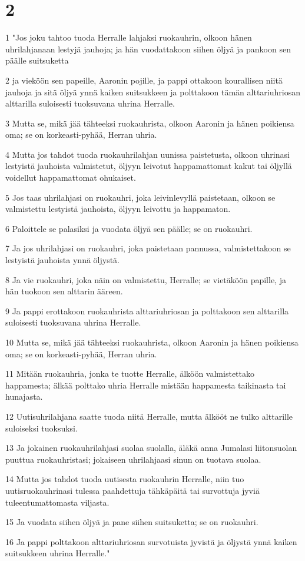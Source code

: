 \chapter{2}

\par 1 "Jos joku tahtoo tuoda Herralle lahjaksi ruokauhrin, olkoon hänen uhrilahjanaan lestyjä jauhoja; ja hän vuodattakoon siihen öljyä ja pankoon sen päälle suitsuketta
\par 2 ja vieköön sen papeille, Aaronin pojille, ja pappi ottakoon kourallisen niitä jauhoja ja sitä öljyä ynnä kaiken suitsukkeen ja polttakoon tämän alttariuhriosan alttarilla suloisesti tuoksuvana uhrina Herralle.
\par 3 Mutta se, mikä jää tähteeksi ruokauhrista, olkoon Aaronin ja hänen poikiensa oma; se on korkeasti-pyhää, Herran uhria.
\par 4 Mutta jos tahdot tuoda ruokauhrilahjan uunissa paistetusta, olkoon uhrinasi lestyistä jauhoista valmistetut, öljyyn leivotut happamattomat kakut tai öljyllä voidellut happamattomat ohukaiset.
\par 5 Jos taas uhrilahjasi on ruokauhri, joka leivinlevyllä paistetaan, olkoon se valmistettu lestyistä jauhoista, öljyyn leivottu ja happamaton.
\par 6 Paloittele se palasiksi ja vuodata öljyä sen päälle; se on ruokauhri.
\par 7 Ja jos uhrilahjasi on ruokauhri, joka paistetaan pannussa, valmistettakoon se lestyistä jauhoista ynnä öljystä.
\par 8 Ja vie ruokauhri, joka näin on valmistettu, Herralle; se vietäköön papille, ja hän tuokoon sen alttarin ääreen.
\par 9 Ja pappi erottakoon ruokauhrista alttariuhriosan ja polttakoon sen alttarilla suloisesti tuoksuvana uhrina Herralle.
\par 10 Mutta se, mikä jää tähteeksi ruokauhrista, olkoon Aaronin ja hänen poikiensa oma; se on korkeasti-pyhää, Herran uhria.
\par 11 Mitään ruokauhria, jonka te tuotte Herralle, älköön valmistettako happamesta; älkää polttako uhria Herralle mistään happamesta taikinasta tai hunajasta.
\par 12 Uutisuhrilahjana saatte tuoda niitä Herralle, mutta älkööt ne tulko alttarille suloiseksi tuoksuksi.
\par 13 Ja jokainen ruokauhrilahjasi suolaa suolalla, äläkä anna Jumalasi liitonsuolan puuttua ruokauhristasi; jokaiseen uhrilahjaasi sinun on tuotava suolaa.
\par 14 Mutta jos tahdot tuoda uutisesta ruokauhrin Herralle, niin tuo uutisruokauhrinasi tulessa paahdettuja tähkäpäitä tai survottuja jyviä tuleentumattomasta viljasta.
\par 15 Ja vuodata siihen öljyä ja pane siihen suitsuketta; se on ruokauhri.
\par 16 Ja pappi polttakoon alttariuhriosan survotuista jyvistä ja öljystä ynnä kaiken suitsukkeen uhrina Herralle."

